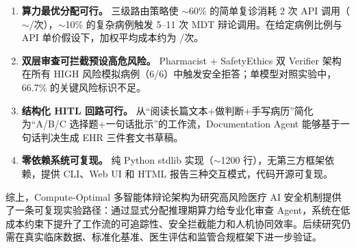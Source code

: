 \documentclass[11pt,a4paper]{ctexart}
\begin{document}
\begin{enumerate}[label=(\arabic*),leftmargin=2em]
    \item \textbf{算力最优分配可行。} 三级路由策略使 $\sim$60\% 的简单复诊消耗 2 次 API 调用（$\sim$/次），$\sim$10\% 的复杂病例触发 5--11 次 MDT 辩论调用。在给定病例比例与 API 单价假设下，加权平均成本约为 /次。
    \item \textbf{双层审查可拦截预设高危风险。} Pharmacist + SafetyEthics 双 Verifier 架构在所有 HIGH 风险模拟病例（6/6）中触发安全拒答；单模型对照实验中，66.7\% 的关键风险标识不足。
    \item \textbf{结构化 HITL 回路可行。} 从``阅读长篇文本+做判断+手写病历''简化为``A/B/C 选择题+一句话批示''的工作流，Documentation Agent 能够基于一句话判决生成 EHR 三件套文书草稿。
    \item \textbf{零依赖系统可复现。} 纯 Python stdlib 实现（$\sim$1200 行），无第三方框架依赖，提供 CLI、Web UI 和 HTML 报告三种交互模式，代码开源可复现。
\end{enumerate}

综上，Compute-Optimal 多智能体辩论架构为研究高风险医疗 AI 安全机制提供了一条可复现实验路径：通过显式分配推理期算力给专业化审查 Agent，系统在低成本约束下提升了工作流的可追踪性、安全拦截能力和人机协同效率。后续研究仍需在真实临床数据、标准化基准、医生评估和监管合规框架下进一步验证。
\end{document}
